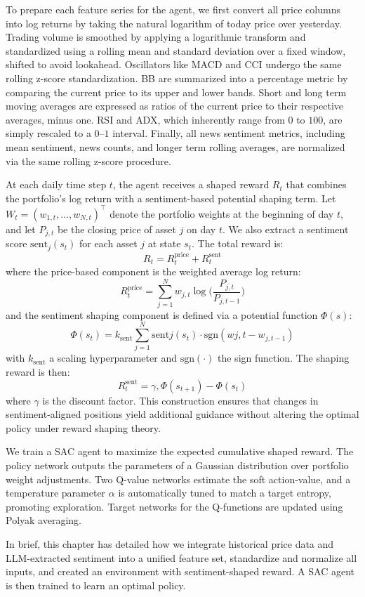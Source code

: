 To prepare each feature series for the agent, we first convert all price columns  into log returns by taking the natural logarithm of today price over yesterday. Trading volume is smoothed by applying a logarithmic transform and standardized using a rolling mean and standard deviation over a fixed window, shifted to avoid lookahead. Oscillators like \gls{MACD} and \gls{CCI} undergo the same rolling z-score standardization. \gls{BB} are summarized into a percentage metric by comparing the current price to its upper and lower bands. Short and long term moving averages are expressed as ratios of the current price to their respective averages, minus one. \gls{RSI} and \gls{ADX}, which inherently range from \(0\) to \(100\), are simply rescaled to a \(0\)–\(1\) interval. Finally, all news sentiment metrics, including mean sentiment, news counts, and longer term rolling averages, are normalized via the same rolling z-score procedure.

At each daily time step \(t\), the agent receives a shaped reward \(R_t\) that combines the portfolio’s log return with a sentiment-based potential shaping term. Let \(W_t = (w_{1,t},\dots,w_{N,t})^\top\) denote the portfolio weights at the beginning of day \(t\), and let \(P_{j,t}\) be the closing price of asset \(j\) on day \(t\). We also extract a sentiment score \(\mathrm{sent}_j(s_t)\) for each asset \(j\) at state \(s_t\). The total reward is:
\[R_t = R_t^{\mathrm{price}} + R_t^{\mathrm{sent}}\]
where the price-based component is the weighted average log return:
\[R_t^{\mathrm{price}} = \sum_{j=1}^N w_{j,t} \log \biggl(\frac{P_{j,t}}{P_{j,t-1}}\biggr)\]
and the sentiment shaping component is defined via a potential function $\Phi(s)$:
\[\Phi(s_t) = k_{\mathrm{sent}} \sum_{j=1}^N \mathrm{sent}j(s_t) \cdot \mathrm{sgn}(w{j,t} - w_{j,t-1})\]
with \(k_{\mathrm{sent}}\) a scaling hyperparameter and \(\mathrm{sgn}(\cdot)\) the sign function. The shaping reward is then:
\[R_t^{\mathrm{sent}} = \gamma,\Phi(s_{t+1}) - \Phi(s_t)\]
where \(\gamma\) is the discount factor. This construction ensures that changes in sentiment-aligned positions yield additional guidance without altering the optimal policy under reward shaping theory.

We train a \gls{SAC} agent to maximize the expected cumulative shaped reward. The policy network outputs the parameters of a Gaussian distribution over portfolio weight adjustments. Two Q-value networks estimate the soft action-value, and a temperature parameter \(\alpha\) is automatically tuned to match a target entropy, promoting exploration. Target networks for the Q-functions are updated using Polyak averaging.

In brief, this chapter has detailed how we integrate historical price data and \gls{LLM}-extracted sentiment into a unified feature set, standardize and normalize all inputs, and created an environment with sentiment-shaped reward. A \gls{SAC} agent is then trained to learn an optimal policy.
